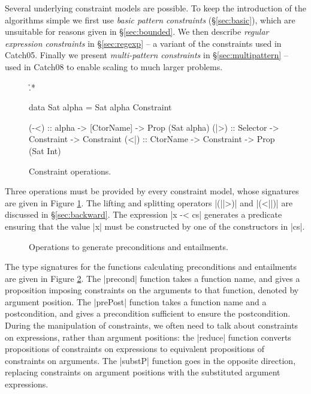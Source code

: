 \documentclass[preprint]{sigplanconf}
\begin{document}
Several underlying constraint models are possible. To keep the introduction of the algorithms simple we first use \textit{basic pattern constraints} (\S\ref{sec:basic}), which are unsuitable for reasons given in \S\ref{sec:bounded}. We then describe \textit{regular expression constraints} in \S\ref{sec:regexp} -- a variant of the constraints used in Catch05. Finally we present \textit{multi-pattern constraints} in \S\ref{sec:multipattern} -- used in Catch08 to enable scaling to much larger problems.

\begin{figure}
\h{.*}\begin{code}
data Sat alpha = Sat alpha Constraint

(-<)  :: alpha -> [CtorName] -> Prop (Sat alpha)
(|>)  :: Selector -> Constraint -> Constraint
(<|)  :: CtorName -> Constraint -> Prop (Sat Int)
\end{code}
\caption{Constraint operations.}
\label{fig:constraint}
\end{figure}

Three operations must be provided by every constraint model, whose signatures are given in Figure \ref{fig:constraint}. The lifting and splitting operators |(||>)| and |(<||)| are discussed in \S\ref{sec:backward}. The expression |x -< cs| generates a predicate ensuring that the value |x| must be constructed by one of the constructors in |cs|.

\begin{figure}
\caption{Operations to generate preconditions and entailments.}
\label{fig:operations}
\end{figure}

The type signatures for the functions calculating preconditions and entailments are given in Figure \ref{fig:operations}. The |precond| function takes a function name, and gives a proposition imposing constraints on the arguments to that function, denoted by argument position. The |prePost| function takes a function name and a postcondition, and gives a precondition sufficient to ensure the postcondition. During the manipulation of constraints, we often need to talk about constraints on expressions, rather than argument positions: the |reduce| function converts propositions of constraints on expressions to equivalent propositions of constraints on arguments. The |substP| function goes in the opposite direction, replacing constraints on argument positions with the substituted argument expressions.
\end{document}
